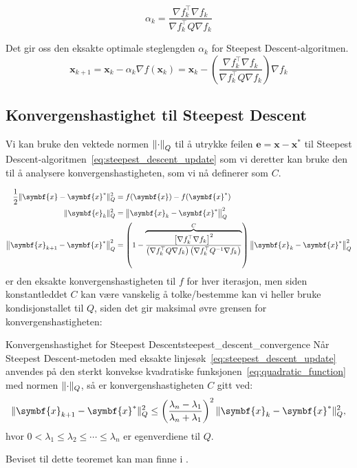 \[
	\alpha_k = \frac{\nabla f_k^\top \nabla f_k}{\nabla f_k^\top Q \nabla f_k}
\]

Det gir oss den eksakte optimale steglengden \(\alpha_k\) for Steepest Descent-algoritmen.
\begin{equation*}
	\symbf{x}_{k+1} = \symbf{x}_k - \alpha_k \nabla f(\symbf{x}_k) = \symbf{x}_k - \left(\frac{\nabla f_k^\top \nabla f_k}{\nabla f_k^\top Q \nabla f_k}\right) \nabla f_k
\end{equation*}\label{eq:steepest_descent_update}


\subsection{Konvergenshastighet til Steepest Descent}
Vi kan bruke den vektede normen $\norm*{\cdot}_Q$ til å utrykke feilen $\symbf{e} = \symbf{x} - \symbf{x}^\ast$ til Steepest Descent-algoritmen~\eqref{eq:steepest_descent_update} som vi deretter kan bruke den til å analysere konvergenshastigheten, som vi nå definerer som \(C\).

\begin{align*}
	\frac{1}{2} \norm{\symbf{x} - \symbf{x}^\ast}_Q^2 & = f(\symbf{x}) - f(\symbf{x}^\ast)                                                                                                                                                                                    \\
	\norm{\symbf{e}_k}_Q^2                             & = \norm*{\symbf{x}_k - \symbf{x}^\ast}_Q^2                                                                                                                                                                            \\
	\norm*{\symbf{x}_{k+1} - \symbf{x}^\ast}_Q^2      & = \left(1 - \overbrace{\frac{\left[\nabla f_k^\top \nabla f_k\right]^2}{\left(\nabla f_k^\top Q \nabla f_k\right)\left(\nabla f_k^\top Q^{-1} \nabla f_k\right)}}^{C}\right) \norm*{\symbf{x}_k - \symbf{x}^\ast}_Q^2
\end{align*}
er den eksakte konvergenshastigheten til $f$ for hver iterasjon, men siden konstantleddet \(C\) kan være vanskelig å tolke/bestemme kan vi heller bruke kondisjonstallet til \(Q\), siden det gir maksimal øvre grensen for konvergenshastigheten:

\begin{theorem}{Konvergenshastighet for Steepest Descent}{steepest_descent_convergence}
	Når Steepest Descent-metoden med eksakte linjesøk~\eqref{eq:steepest_descent_update} anvendes på den sterkt konvekse kvadratiske funksjonen~\eqref{eq:quadratic_function} med normen \(\norm{\cdot}_Q\), så er konvergenshastigheten \(C\) gitt ved:
	\[
		\norm{\symbf{x}_{k+1} - \symbf{x}^\ast}_Q^2 \leq \left(\frac{\lambda_n - \lambda_1}{\lambda_n + \lambda_1}\right)^2 \norm{\symbf{x}_k - \symbf{x}^\ast}_Q^2,
	\]
	hvor \(0 < \lambda_1 \leq \lambda_2 \leq \cdots \leq \lambda_n\) er egenverdiene til \(Q\).
\end{theorem}
Beviset til dette teoremet kan man finne i \cite{luenberger1984linear}.

